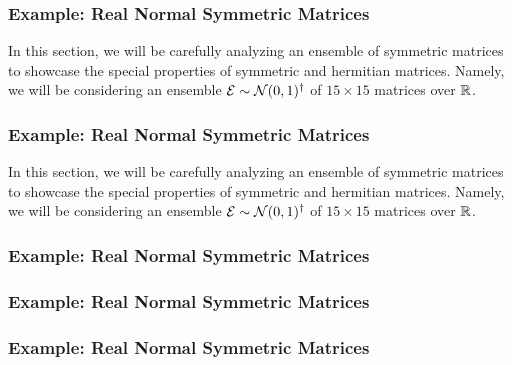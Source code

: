 \begin{frame} \frametitle{Example: Real Normal Symmetric Matrices}

  In this section, we will be carefully analyzing an ensemble of symmetric matrices to showcase
  the special properties of symmetric and hermitian matrices.
  Namely, we will be considering an ensemble $\mathcal{E} \sim \mathcal{N}(0,1)^\dagger$ of $15 \times 15$ matrices over $\mathbb{R}$.

\end{frame}

\begin{frame} \frametitle{Example: Real Normal Symmetric Matrices}

  In this section, we will be carefully analyzing an ensemble of symmetric matrices to showcase
  the special properties of symmetric and hermitian matrices.
  Namely, we will be considering an ensemble $\mathcal{E} \sim \mathcal{N}(0,1)^\dagger$ of $15 \times 15$ matrices over $\mathbb{R}$.

\end{frame}

\begin{frame} \frametitle{Example: Real Normal Symmetric Matrices}


\end{frame}

\begin{frame} \frametitle{Example: Real Normal Symmetric Matrices}


\end{frame}

\begin{frame} \frametitle{Example: Real Normal Symmetric Matrices}


\end{frame}


